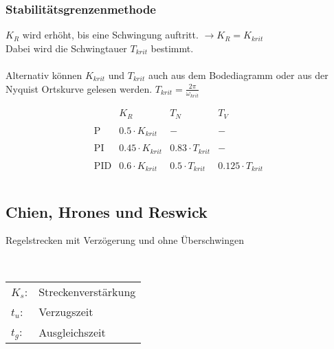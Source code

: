 \subsubsection{Stabilitätsgrenzenmethode}
$K_R$ wird erhöht, bis eine Schwingung auftritt. $\to K_R = K_{krit}$\\
Dabei wird die Schwingtauer $T_{krit}$ bestimmt. \\\\
Alternativ können $K_{krit}$ und $T_{krit}$ auch aus dem Bodediagramm oder 
aus der Nyquist Ortskurve gelesen werden. $T_{krit} = \frac{2 \pi}{\omega_{krit}}$
\begin{table}[h!]
    \[
        \begin{array}{lccc}
            &
                K_R &
                T_N &
                T_V \\\\
            \text{P} &
                0.5 \cdot K_{krit} &
                - &
                - \\\\
            \text{PI} &
                0.45 \cdot K_{krit} &
                0.83 \cdot T_{krit} &
                - \\\\
            \text{PID} &
                0.6 \cdot K_{krit} &
                0.5 \cdot T_{krit} &
                0.125 \cdot T_{krit} \\\\
        \end{array}
    \]
\end{table}


\subsection{Chien, Hrones und Reswick}
Regelstrecken mit Verzögerung und ohne Überschwingen
\begin{figure}[h!]
    \centering
\end{figure}
\\
\begin{tabular}{@{}ll}
    $K_s$: & Streckenverstärkung\\
    $t_u$: & Verzugszeit\\
    $t_g$: & Ausgleichszeit\\
\end{tabular}

